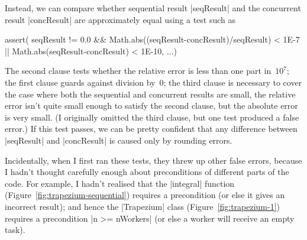
Instead, we can compare whether sequential result |seqResult| and the
concurrent result |concResult| are approximately equal using a test such as
\begin{scala}
  assert(
    seqResult != 0.0 && Math.abs((seqResult-concResult)/seqResult) < 1E-7 ||
      Math.abs(seqResult-concResult) < 1E-10, ...)
\end{scala}
%
The second clause tests whether the relative error is less than one part
in~$10^7$; the first clause guards against division by~$0$; the third clause
is necessary to cover the case where both the sequential and concurrent
results are small, the relative error isn't quite small enough to satisfy the
second clause, but the absolute error is very small.  (I originally omitted
the third clause, but one test produced a false error.)  If this test passes,
we can be pretty confident that any difference between |seqResult| and
|concResult| is caused only by rounding errors.

Incidentally, when I first ran these tests, they threw up other false errors,
because I hadn't thought carefully enough about preconditions of different
parts of the code.  For example, I hadn't realised that the |integral|
function (Figure~\ref{fig:trapezium-sequential}) requires a precondition
 (or else it gives an incorrect result); and hence the |Trapezium|
class (Figure~\ref{fig:trapezium-1}) requires a precondition |n >= nWorkers|
(or else a worker will receive an empty task).  
